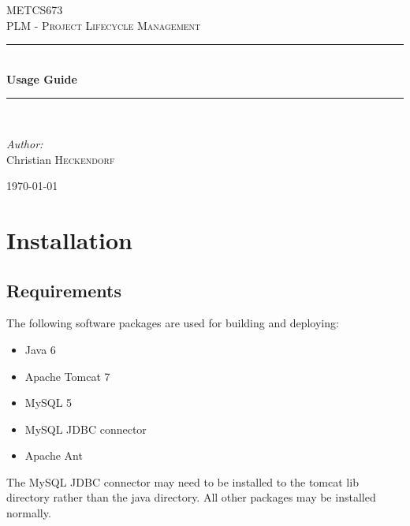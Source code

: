 \documentclass{article}
\newcommand{\HRule}{\rule{\linewidth}{0.5mm}}
\begin{document}
	\begin{titlepage}
		\begin{center}
			\textsc{\LARGE METCS673}\\[1.5cm]
			\textsc{\Large PLM - Project Lifecycle Management}\\[0.5cm]
			\HRule \\[0.4cm]
			{ \huge \bfseries Usage Guide \\[0.4cm] }
			\HRule \\[1.5cm]

			\begin{minipage}{0.4\textwidth}
			\begin{flushleft} \large
			\emph{Author:}\\
			Christian \textsc{Heckendorf}
			\end{flushleft}
			\end{minipage}

			\vfill

			{\large \today}
		\end{center}
	\end{titlepage}

	\section{Installation}

	\subsection{Requirements}

	The following software packages are used for building and deploying:
	\begin{itemize}
		\item{Java 6}
		\item{Apache Tomcat 7}
		\item{MySQL 5}
		\item{MySQL JDBC connector}
		\item{Apache Ant}
	\end{itemize}

	The MySQL JDBC connector may need to be installed to the tomcat lib directory rather than the java directory. All other packages may be installed normally.
\end{document}

